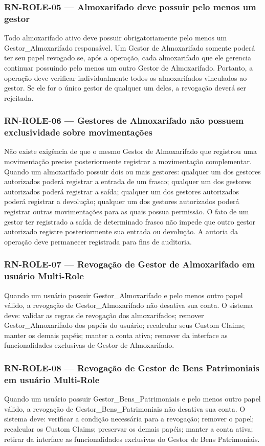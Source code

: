 \subsubsection{RN-ROLE-05 — Almoxarifado deve possuir pelo menos um gestor}
Todo almoxarifado ativo deve possuir obrigatoriamente pelo menos um Gestor\_Almoxarifado responsável.
Um Gestor de Almoxarifado somente poderá ter seu papel revogado se, após a operação, cada almoxarifado que ele gerencia continuar possuindo pelo menos um outro Gestor de Almoxarifado.
Portanto, a operação deve verificar individualmente todos os almoxarifados vinculados ao gestor.
Se ele for o único gestor de qualquer um deles, a revogação deverá ser rejeitada.

\subsubsection{RN-ROLE-06 — Gestores de Almoxarifado não possuem exclusividade sobre movimentações}
Não existe exigência de que o mesmo Gestor de Almoxarifado que registrou uma movimentação precise posteriormente registrar a movimentação complementar.
Quando um almoxarifado possuir dois ou mais gestores:
qualquer um dos gestores autorizados poderá registrar a entrada de um frasco;
qualquer um dos gestores autorizados poderá registrar a saída;
qualquer um dos gestores autorizados poderá registrar a devolução;
qualquer um dos gestores autorizados poderá registrar outras movimentações para as quais possua permissão.
O fato de um gestor ter registrado a saída de determinado frasco não impede que outro gestor autorizado registre posteriormente sua entrada ou devolução.
A autoria da operação deve permanecer registrada para fins de auditoria.

\subsubsection{RN-ROLE-07 — Revogação de Gestor de Almoxarifado em usuário Multi-Role}
Quando um usuário possuir Gestor\_Almoxarifado e pelo menos outro papel válido, a revogação de Gestor\_Almoxarifado não desativa sua conta.
O sistema deve:
validar as regras de revogação dos almoxarifados;
remover Gestor\_Almoxarifado dos papéis do usuário;
recalcular seus Custom Claims;
manter os demais papéis;
manter a conta ativa;
remover da interface as funcionalidades exclusivas de Gestor de Almoxarifado.

\subsubsection{RN-ROLE-08 — Revogação de Gestor de Bens Patrimoniais em usuário Multi-Role}
Quando um usuário possuir Gestor\_Bens\_Patrimoniais e pelo menos outro papel válido, a revogação de Gestor\_Bens\_Patrimoniais não desativa sua conta.
O sistema deve:
verificar a condição necessária para a revogação;
remover o papel;
recalcular os Custom Claims;
preservar os demais papéis;
manter a conta ativa;
retirar da interface as funcionalidades exclusivas do Gestor de Bens Patrimoniais.

